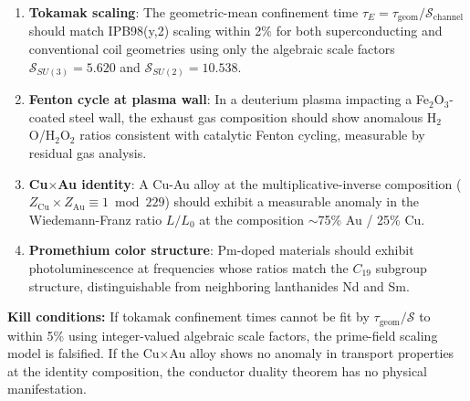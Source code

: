 \begin{enumerate}
    \item \textbf{Tokamak scaling}: The geometric-mean confinement time $\tau_E = \tau_{\text{geom}} / \mathcal{S}_{\text{channel}}$ should match IPB98(y,2) scaling within 2\% for both superconducting and conventional coil geometries using only the algebraic scale factors $\mathcal{S}_{SU(3)} = 5.620$ and $\mathcal{S}_{SU(2)} = 10.538$.

    \item \textbf{Fenton cycle at plasma wall}: In a deuterium plasma impacting a Fe$_2$O$_3$-coated steel wall, the exhaust gas composition should show anomalous H$_2$O/H$_2$O$_2$ ratios consistent with catalytic Fenton cycling, measurable by residual gas analysis.

    \item \textbf{Cu$\times$Au identity}: A Cu-Au alloy at the multiplicative-inverse composition ($Z_{\text{Cu}} \times Z_{\text{Au}} \equiv 1 \bmod 229$) should exhibit a measurable anomaly in the Wiedemann-Franz ratio $L/L_0$ at the composition $\sim$75\% Au / 25\% Cu.

    \item \textbf{Promethium color structure}: Pm-doped materials should exhibit photoluminescence at frequencies whose ratios match the $C_{19}$ subgroup structure, distinguishable from neighboring lanthanides Nd and Sm.
\end{enumerate}

\textbf{Kill conditions:} If tokamak confinement times cannot be fit by $\tau_{\text{geom}} / \mathcal{S}$ to within 5\% using integer-valued algebraic scale factors, the prime-field scaling model is falsified. If the Cu$\times$Au alloy shows no anomaly in transport properties at the identity composition, the conductor duality theorem has no physical manifestation.


